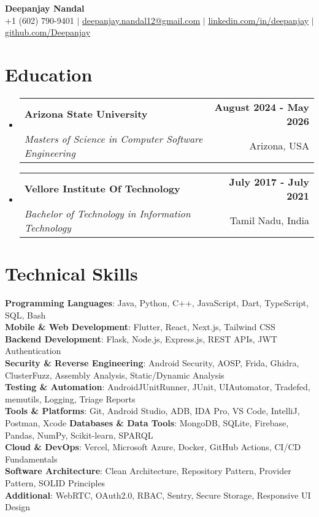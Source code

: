 \documentclass[letterpaper,11pt]{article}
\makeatletter
\newcommand{\resumeSubheading}[4]{
  \vspace{-1pt}\item
    \begin{tabular*}{0.97\textwidth}[t]{l@{\extracolsep{\fill}}r}
      \textbf{#1} & \textbf{#4} \\
      \textit{\normalsize #3} & \normalsize #2 \\
    \end{tabular*}\vspace{-3pt}
}
\newcommand{\resumeSubHeadingListStart}{\begin{itemize}[leftmargin=0.15in, label={}]}
\newcommand{\resumeSubHeadingListEnd}{\end{itemize}}
\makeatother
\begin{document}
\begin{center}
    {\fontsize{14pt}{16pt}\selectfont\textbf{Deepanjay Nandal}} \\ \vspace{2pt}
    \normalsize +1 (602) 790-9401 $|$ \href{mailto:deepanjay.nandal12@gmail.com}{deepanjay.nandal12@gmail.com} $|$ 
    \href{https://www.linkedin.com/in/deepanjay-nandal/}{linkedin.com/in/deepanjay} $|$
    \href{https://github.com/DeepanjayNandal}{github.com/Deepanjay}
\end{center}

\vspace{-3pt}

\vspace{-9pt}
\section{Education}
\resumeSubHeadingListStart
  \resumeSubheading
    {Arizona State University}{Arizona, USA}
    {Masters of Science in Computer Software Engineering}{August 2024 - May 2026}
  \resumeSubheading
    {Vellore Institute Of Technology}{Tamil Nadu, India}
    {Bachelor of Technology in Information Technology}{July 2017 - July 2021}
\resumeSubHeadingListEnd

\section{Technical Skills}
\begin{itemize}[leftmargin=0.15in, label={}]
  \small{\item{
    \textbf{Programming Languages}{: Java, Python, C++, JavaScript, Dart, TypeScript, SQL, Bash} \\
    \textbf{Mobile \& Web Development}{: Flutter, React, Next.js, Tailwind CSS} \\
    \textbf{Backend Development}{: Flask, Node.js, Express.js, REST APIs, JWT Authentication} \\
    \textbf{Security \& Reverse Engineering}{: Android Security, AOSP, Frida, Ghidra, ClusterFuzz, Assembly Analysis, Static/Dynamic Analysis} \\
    \textbf{Testing \& Automation}{: AndroidJUnitRunner, JUnit, UIAutomator, Tradefed, memutils, Logging, Triage Reports} \\
    \textbf{Tools \& Platforms}{: Git, Android Studio, ADB, IDA Pro, VS Code, IntelliJ, Postman, Xcode}
    \textbf{Databases \& Data Tools}{: MongoDB, SQLite, Firebase, Pandas, NumPy, Scikit-learn, SPARQL} \\
    \textbf{Cloud \& DevOps}{: Vercel, Microsoft Azure, Docker, GitHub Actions, CI/CD Fundamentals} \\
    \textbf{Software Architecture}{: Clean Architecture, Repository Pattern, Provider Pattern, SOLID Principles} \\
    \textbf{Additional}{: WebRTC, OAuth2.0, RBAC, Sentry, Secure Storage, Responsive UI Design}
  }}
\end{itemize}
\end{document}
